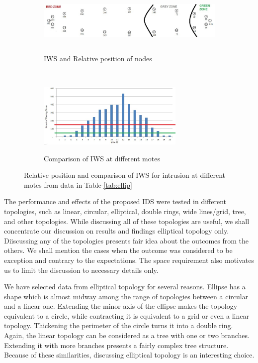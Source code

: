 \documentclass[conference,final]{IEEEtran}
\begin{document}
\begin{figure}[t!]
\label{fig:ellip}
    \centering
    \begin{subfigure}[b]{0.5\textwidth}
        \centering
        \includegraphics[height=1in, width=4in]{Elliptical}
        \label{subfig:elliptopo}
        \caption{IWS and Relative position of nodes}
    \end{subfigure}%
    ~ 
    \begin{subfigure}[b]{0.5\textwidth}
        \centering
        \includegraphics[height=1.2in]{Elliptical_column}
        \label{subfig:ellipgraph}
        \caption{Comparison of IWS at different motes}
    \end{subfigure}
    \caption{Relative position and comparison of IWS for intrusion at different motes from data in Table-\ref{tab:ellip}}
\end{figure}


The performance and effects of the proposed IDS were tested in different topologies, such as linear, circular, elliptical, double rings, wide lines/grid, tree, and other topologies.
While discussing all of these topologies are useful, we shall concentrate our discussion on results and findings elliptical topology only.
Diiscussing any of the topologies presents fair idea about the outcomes from the others. 
We shall mention the cases when the outcome was considered to be exception and contrary to the expectations.
The space requirement also motivates us to limit the discussion to necessary details only.



We have selected data from elliptical topology for several reasons.
Ellipse has a shape which is almost midway among the range of topologies between a circular and a linear one.
Extending the minor axis of the ellipse makes the topology equivalent to a circle, while contracting it is equivalent to a grid or even a linear topology.
Thickening the perimeter of the circle turns it into a double ring.
Again, the linear topology can be considered as a tree with one or two branches.
Extending it with more branches presents a fairly complex tree structure.
Because of these similarities, discussing elliptical topology is an interesting choice.
\end{document}
